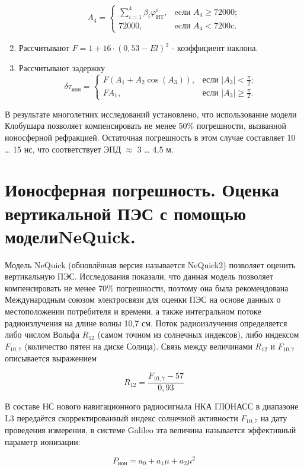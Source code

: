 \documentclass[14pt,a4paper,oneside]{extarticle}
\begin{document}
\begin{enumerate}
\[\begin{aligned}
                   & A_{4} =\begin{cases}\sum\limits_{i=1}^4\beta_i\varphi_{\text{ИТ}}^i,&\text{ecли }A_4\geqslant72000;\\72000,&\text{ecли }A_4<7200\text{c}.\end{cases}
              \end{aligned}\]
    \item Рассчитывают $F=1+16\cdot(0,53-El)^3$ - коэффициент наклона.
    \item Рассчитывают задержку \[\delta\tau_{\text{ион}}=\begin{cases}F\left(A_1+A_2\cos(A_3)\right),&\text{если }|A_3|<\frac{\pi}{2};\\FA_1,&\text{если }|A_3|\geqslant\frac{\pi}{2}.\end{cases}\]
\end{enumerate}

В результате многолетних исследований установлено, что использование модели Клобушара позволяет компенсировать не менее 50\% погрешности, вызванной ионосферной рефракцией. Остаточная погрешность в этом случае составляет 10 … 15 нс, что соответствует ЭПД $\approx$ 3 … 4,5 м.

\section{Ионосферная погрешность. Оценка вертикальной ПЭС с помощью моделиNeQuick.}

Модель NeQuick (обновлённая версия называется NeQuick2) позволяет оценить вертикальную ПЭС. Исследования показали, что данная модель позволяет компенсировать не менее 70\% погрешности, поэтому она была рекомендована Международным союзом электросвязи для оценки ПЭС на основе данных о местоположении потребителя и времени, а также интегральном потоке радиоизлучения на длине волны 10,7 см. Поток радиоизлучения определяется либо числом Вольфа $R_{12}$ (самом точном из солнечных индексов), либо индексом $F_{10,7}$ (количество пятен на диске Солнца). Связь между величинами $R_{12}$ и $F_{10,7}$ описывается выражением

\[R_{12}=\frac{F_{10,7}-57}{0,93}\]

В составе НС нового навигационного радиосигнала НКА ГЛОНАСС в диапазоне L3 передаётся скорректированный индекс солнечной активности $F_{10,7}$ на дату проведения измерения, в системе Galileo эта величина называется эффективный параметр ионизации:

\[P_{\text{ион}} = a _ 0 + a _ 1 \mu + a _ 2 \mu ^ 2\]
\end{document}

